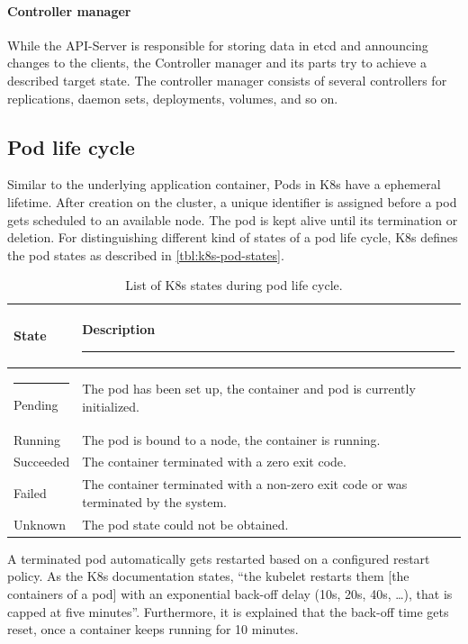 \paragraph*{Controller manager} While the \ac{API}-Server is responsible for storing data in etcd and announcing changes to the clients, the Controller manager and its parts try to achieve a described target state\cite{Luksa.2018}. The controller manager consists of several controllers for replications, daemon sets, deployments, volumes, and so on.


\subsection{Pod life cycle}
\label{chap:design.life_cycle}
Similar to the underlying application container, Pods in \ac{K8s} have a ephemeral lifetime\cite{Kubernetes.20230217}. After creation on the cluster, a unique identifier is assigned before a pod gets scheduled to an available node\cite{Kubernetes.20230217}. The pod is kept alive until its termination or deletion\cite{Kubernetes.20230217}.
For distinguishing different kind of states of a pod life cycle, \ac{K8s} defines the pod states as described in \autoref{tbl:k8s-pod-states}.

\begin{table}[h!]
	\centering
	\begin{tabular}{|l | p{}|} 
		\hline
		\bfseries State & \bfseries Description  \rule{-5pt}{2.6ex} \\
		\hline \rule{-3pt}{3ex}
		Pending & The pod has been set up, the container and pod is currently initialized. \\
		\hline
		Running & The pod is bound to a node, the container is running. \\
		\hline
		Succeeded & The container terminated with a zero exit code. \\ 
		\hline
		Failed & The container terminated with a non-zero exit code or was terminated by the system. \\ 
		\hline
		Unknown & The pod state could not be obtained. \\ 
		[1ex] 
		\hline
	\end{tabular}
	\caption{List of \ac{K8s} states during pod life cycle\cite{Kubernetes.20230217}.}
	\label{tbl:k8s-pod-states}
\end{table}

A terminated pod automatically gets restarted based on a configured restart policy. As the \ac{K8s} documentation states, \enquote{the kubelet restarts them [the containers of a pod] with an exponential back-off delay (10s, 20s, 40s, …), that is capped at five minutes}\cite{Kubernetes.20230217}. Furthermore, it is explained that the back-off time gets reset, once a container keeps running for 10 minutes\cite{Kubernetes.20230217}.


